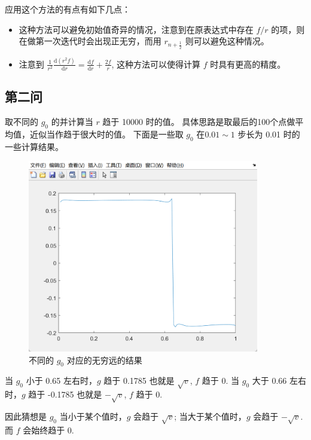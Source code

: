 \documentclass[11pt]{ctexart}
\begin{document}
    应用这个方法的有点有如下几点：
    \begin{itemize}
        \item 这种方法可以避免初始值奇异的情况，注意到在原表达式中存在 \(f/r\) 的项，则在做第一次迭代时会出现正无穷，而用
        \(r_{n+\frac{1}{2}}\) 则可以避免这种情况。
        \item 注意到 \(\frac{1}{r^2}\frac{\text{d}(r^2 f)}{\text{d}r}=
        \frac{\text{d}f}{\text{d}r}+\frac{2f}{r}\), 这种方法可以使得计算 \(f\) 时具有更高的精度。
    \end{itemize}
    
    \subsection{第二问}
    取不同的 \(g_0\) 的并计算当 \(r\) 趋于 10000 时的值。
    具体思路是取最后的100个点做平均值，近似当作趋于很大时的值。
    下面是一些取 \(g_0\) 在\(0.01\sim 1\) 步长为 0.01 时的一些计算结果。
    \begin{figure}[H]
        \centering
        \includegraphics[width=0.9\textwidth]{picture/exp3_2}
        \caption{不同的 \(g_0\) 对应的无穷远的结果}
    \end{figure}

    当 \(g_0\) 小于 0.65 左右时，\(g\) 趋于 0.1785 也就是 \(\sqrt {v}\), \(f\) 趋于 0.
    当 \(g_0\) 大于 0.66 左右时，\(g\) 趋于 -0.1785 也就是 \(-\sqrt {v}\), \(f\) 趋于 0.

    因此猜想是 \(g_0\) 当小于某个值时，\(g\) 会趋于 \(\sqrt {v}\); 当大于某个值时，\(g\) 会趋于 \(-\sqrt {v}\).
    而 \(f\) 会始终趋于 0.
\end{document}

